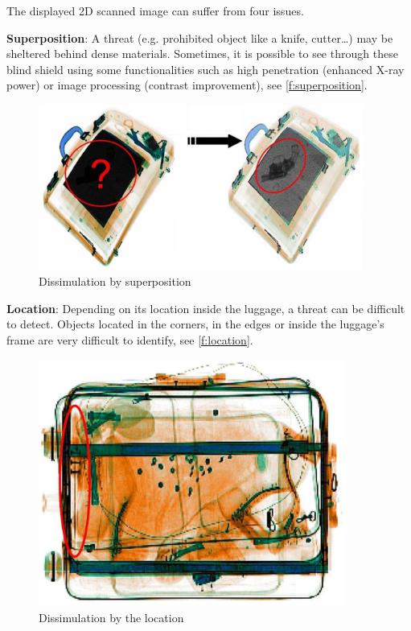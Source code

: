 The displayed 2D scanned image can suffer from four issues.

\textbf{Superposition}: A threat (e.g. prohibited object like a knife, cutter…) may be sheltered behind dense materials. Sometimes, it is possible to see through these blind shield using some functionalities such as high penetration (enhanced X-ray power) or image processing (contrast improvement),  see  \autoref{f:superposition}. 
\begin{figure}
\centering
	\includegraphics[width=0.95\textwidth]{Figures/superposition}
	\caption{Dissimulation by superposition}
	\label{f:superposition}
\end{figure}

\textbf{Location}: Depending on its location inside the luggage, a threat can be difficult to detect. Objects located in the corners, in the edges or inside the luggage's frame are very difficult to identify,  see  \autoref{f:location}.
\begin{figure}
\centering
	\includegraphics[width=0.9\textwidth]{Figures/positioning}
	\caption{Dissimulation by the location}
	\label{f:location}
\end{figure}

